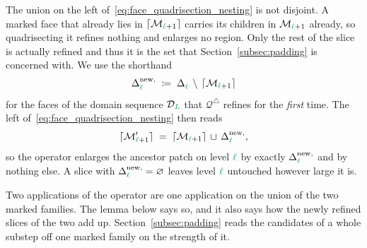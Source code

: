 \documentclass[a4paper, 12pt]{article}
\makeatletter
\newcommand{\quadriF}{\mathcal{Q}^{\triangle}}                   %
\newcommand{\green}{\color{ForestGreen}}
\DeclareRobustCommand{\simplexsubsetTwo}[2][]{\Delta\ifx\@empty#1\@empty\else^{#1}\fi_{#2}}
\DeclareRobustCommand{\simplexsubsetNew}[2][]{\Delta^{\mathrm{new}\ifx\@empty#1\@empty\else,#1\fi}_{#2}}
\renewcommand{\l}{{\green\ell}}
\renewcommand{\L}{{\green L}}
\newcommand{\M}{\mathcal{M}}
\theoremstyle{definition}
\theoremstyle{plain}
\numberwithin{equation}{section}
\newcommand{\ancestorPatch}[1]{\lceil #1 \rceil}
\DeclareRobustCommand{\domseq}[1][]{\mathcal{D}\ifx\@empty#1\@empty\else_{#1}\fi}
\makeatother
\begin{document}
The union on the left of~\eqref{eq:face_quadrisection_nesting} is not disjoint. A marked face that already lies in $\ancestorPatch{\M_{\l+1}}$ carries its children in $\M_{\l+1}$ already, so quadrisecting it refines nothing and enlarges no region. Only the rest of the slice is actually refined and thus it is the set that Section~\ref{subsec:padding} is concerned with. We use the shorthand
\begin{equation}
    \label{eq:newly_refined_slice}
    \simplexsubsetNew{\l} \; \coloneq \; \simplexsubsetTwo{\l} \, \setminus \, \ancestorPatch{\M_{\l+1}}
\end{equation}
for the faces of the domain sequence $\domseq[\L]$ that $\quadriF$ refines for the \emph{first} time. The left of~\eqref{eq:face_quadrisection_nesting} then reads
\begin{equation}
    \label{eq:ancestor_patch_enlargement}
    \ancestorPatch{\M'_{\l+1}} \; = \; \ancestorPatch{\M_{\l+1}} \, \sqcup \, \simplexsubsetNew{\l} ,
\end{equation}
so the operator enlarges the ancestor patch on level $\l$ by exactly $\simplexsubsetNew{\l}$ and by nothing else. A slice with $\simplexsubsetNew{\l} = \varnothing$ leaves level $\l$ untouched however large it is.

Two applications of the operator are one application on the union of the two marked families. The lemma below says so, and it also says how the newly refined slices of the two add up. Section~\ref{subsec:padding} reads the candidates of a whole substep off one marked family on the strength of it.
\end{document}
